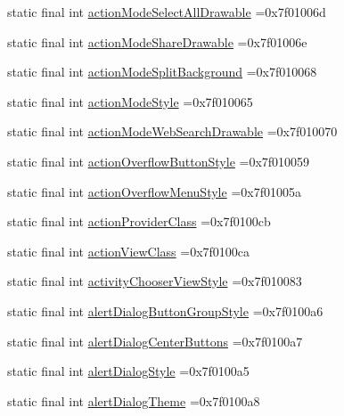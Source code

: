 \begin{DoxyCompactItemize}
\item 
static final int \hyperlink{classproject4_1_1xaria_1_1R_1_1attr_a733c23f5afc5d0af2ae987558473390a}{action\+Mode\+Select\+All\+Drawable} =0x7f01006d
\item 
static final int \hyperlink{classproject4_1_1xaria_1_1R_1_1attr_ac90de15cb9e25cdc3c0b1588df74b451}{action\+Mode\+Share\+Drawable} =0x7f01006e
\item 
static final int \hyperlink{classproject4_1_1xaria_1_1R_1_1attr_aeee48489a676307cf6ee4c9f2d435d5a}{action\+Mode\+Split\+Background} =0x7f010068
\item 
static final int \hyperlink{classproject4_1_1xaria_1_1R_1_1attr_a6440a901501080069ee6782346158452}{action\+Mode\+Style} =0x7f010065
\item 
static final int \hyperlink{classproject4_1_1xaria_1_1R_1_1attr_a1829a965361078065ea493557c2717f3}{action\+Mode\+Web\+Search\+Drawable} =0x7f010070
\item 
static final int \hyperlink{classproject4_1_1xaria_1_1R_1_1attr_ae1bdeba747bc65003cb910d0a8e7ed23}{action\+Overflow\+Button\+Style} =0x7f010059
\item 
static final int \hyperlink{classproject4_1_1xaria_1_1R_1_1attr_a7e8ca524c0f8577cfa586268e267ac0d}{action\+Overflow\+Menu\+Style} =0x7f01005a
\item 
static final int \hyperlink{classproject4_1_1xaria_1_1R_1_1attr_a12eda25241e170bac64a48f4bf130453}{action\+Provider\+Class} =0x7f0100cb
\item 
static final int \hyperlink{classproject4_1_1xaria_1_1R_1_1attr_a8777391ce266f69c00b440e2d0e0c6a6}{action\+View\+Class} =0x7f0100ca
\item 
static final int \hyperlink{classproject4_1_1xaria_1_1R_1_1attr_a4e388f084ee32be85c781d07c0eddf1d}{activity\+Chooser\+View\+Style} =0x7f010083
\item 
static final int \hyperlink{classproject4_1_1xaria_1_1R_1_1attr_a92454ec0575a4b9c338de8e80ceff39c}{alert\+Dialog\+Button\+Group\+Style} =0x7f0100a6
\item 
static final int \hyperlink{classproject4_1_1xaria_1_1R_1_1attr_a7ab87094dd6904302004cd074672ce58}{alert\+Dialog\+Center\+Buttons} =0x7f0100a7
\item 
static final int \hyperlink{classproject4_1_1xaria_1_1R_1_1attr_a88cfd168b968d5f4bf3679115d6c54f6}{alert\+Dialog\+Style} =0x7f0100a5
\item 
static final int \hyperlink{classproject4_1_1xaria_1_1R_1_1attr_a588b089db6e4e10fbc317263059bb6f1}{alert\+Dialog\+Theme} =0x7f0100a8

\end{DoxyCompactItemize}

